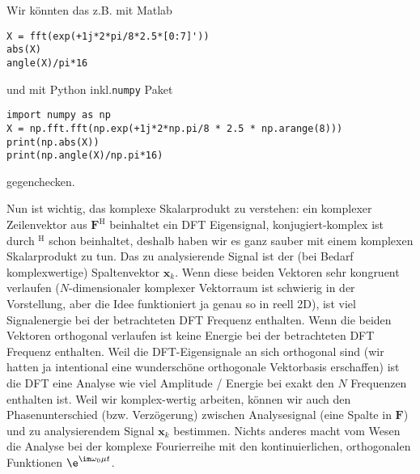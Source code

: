 \begin{ExCalc}

%
Wir könnten das z.B. mit Matlab
\begin{verbatim}
X = fft(exp(+1j*2*pi/8*2.5*[0:7]'))
abs(X)
angle(X)/pi*16
\end{verbatim}
und mit Python inkl.\texttt{numpy} Paket
\begin{verbatim}
import numpy as np
X = np.fft.fft(np.exp(+1j*2*np.pi/8 * 2.5 * np.arange(8)))
print(np.abs(X))
print(np.angle(X)/np.pi*16)
\end{verbatim}
gegenchecken.
%

Nun ist wichtig, das komplexe Skalarprodukt zu verstehen: ein komplexer
Zeilenvektor aus $\bm{F}^\mathrm{H}$ beinhaltet ein DFT Eigensignal,
konjugiert-komplex ist durch $^\mathrm{H}$ schon beinhaltet,
deshalb haben wir es ganz sauber mit einem komplexen Skalarprodukt zu tun.
Das zu analysierende Signal ist der (bei Bedarf komplexwertige) Spaltenvektor $\bm{x}_k$.
Wenn diese beiden Vektoren sehr kongruent verlaufen ($N$-dimensionaler
komplexer Vektorraum ist schwierig in der Vorstellung, aber die Idee funktioniert
ja genau so in reell 2D), ist viel Signalenergie
bei der betrachteten DFT Frequenz enthalten. Wenn die beiden Vektoren orthogonal
verlaufen ist keine Energie bei der betrachteten DFT Frequenz enthalten.
%
Weil die DFT-Eigensignale an sich orthogonal sind (wir hatten ja intentional
eine wunderschöne orthogonale
Vektorbasis erschaffen) ist die DFT eine Analyse wie viel Amplitude / Energie
bei exakt den $N$ Frequenzen enthalten ist. Weil wir komplex-wertig arbeiten, können
wir auch den Phasenunterschied (bzw. Verzögerung)
zwischen Analysesignal (eine Spalte in $\bm{F}$)
und zu analysierendem Signal $\bm{x}_k$ bestimmen. Nichts anderes macht vom Wesen
die Analyse bei der komplexe Fourierreihe mit den kontinuierlichen, orthogonalen
Funktionen $\e^{\im\omega_0 \mu t}$.
%


\end{ExCalc}
